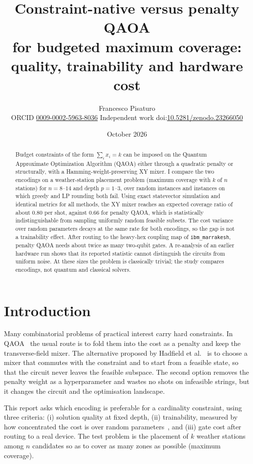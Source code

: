 \documentclass[11pt,a4paper]{article}
\title{\vspace{-1.2cm}Constraint-native versus penalty QAOA\\ for budgeted maximum coverage:\\ quality, trainability and hardware cost}
\author{Francesco Pisaturo\\[2pt]\small ORCID \href{https://orcid.org/0009-0002-5963-8036}{0009-0002-5963-8036} \quad Independent work \quad doi:\href{https://doi.org/10.5281/zenodo.23266050}{10.5281/zenodo.23266050}}
\date{October 2026}
\begin{document}
\maketitle
\vspace{-0.6cm}
\begin{abstract}
\noindent Budget constraints of the form $\sum_i x_i = k$ can be imposed on the Quantum
Approximate Optimization Algorithm (QAOA) either through a quadratic penalty or structurally,
with a Hamming-weight-preserving XY mixer. I compare the two encodings on a weather-station
placement problem (maximum coverage with $k$ of $n$ stations) for $n=8$--$14$ and depth
$p=1$--$3$, over \NR{} random instances and \NH{} instances on which greedy and LP rounding both
fail. Using exact statevector simulation and identical metrics for all methods, the XY mixer
reaches an expected coverage ratio of about $0.80$ per shot, against $0.66$ for penalty QAOA,
which is statistically indistinguishable from sampling uniformly random feasible subsets. The
cost variance over random parameters decays at the same rate for both encodings, so the gap is
not a trainability effect. After routing to the heavy-hex coupling map of \texttt{ibm\_marrakesh},
penalty QAOA needs about twice as many two-qubit gates. A re-analysis of an earlier hardware run
shows that its reported statistic cannot distinguish the circuits from uniform noise. At these
sizes the problem is classically trivial; the study compares encodings, not quantum and classical
solvers.
\end{abstract}

\section{Introduction}
Many combinatorial problems of practical interest carry hard constraints. In QAOA~\cite{farhi2014}
the usual route is to fold them into the cost as a penalty and keep the transverse-field mixer.
The alternative proposed by Hadfield et al.~\cite{hadfield2019} is to choose a mixer that commutes
with the constraint and to start from a feasible state, so that the circuit never leaves the
feasible subspace. The second option removes the penalty weight as a hyperparameter and wastes
no shots on infeasible strings, but it changes the circuit and the optimisation landscape.

This report asks which encoding is preferable for a cardinality constraint, using three
criteria: (i) solution quality at fixed depth, (ii) trainability, measured by how concentrated
the cost is over random parameters~\cite{mcclean2018,arrasmith2022}, and (iii) gate cost after
routing to a real device. The test problem is the placement of $k$ weather stations among $n$
candidates so as to cover as many zones as possible (maximum coverage).
\end{document}
